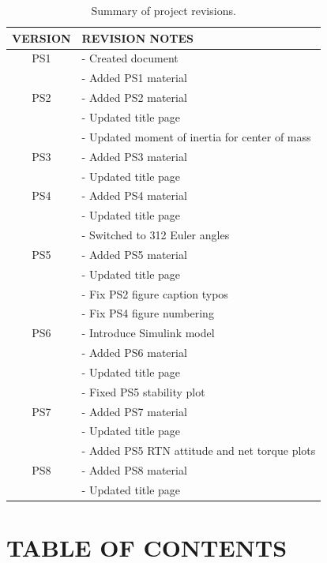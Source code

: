 \documentclass[12pt,a4paper,notitlepage]{article}
\begin{document}
\begin{table}[h!]
\begin{center}
\begin{tabular} [0.9 \textwidth]{cl}
\hline \hline
\multicolumn{1}{c}{VERSION} & \multicolumn{1}{l}{REVISION NOTES} \\
\hline
PS1 & - Created document \\
    & - Added PS1 material \\
\hline
PS2 & - Added PS2 material \\
    & - Updated title page \\
    & - Updated moment of inertia for center of mass \\
\hline
PS3 & - Added PS3 material \\
    & - Updated title page \\
\hline
PS4 & - Added PS4 material \\
    & - Updated title page \\
    & - Switched to 312 Euler angles \\
\hline
PS5 & - Added PS5 material \\
    & - Updated title page \\
    & - Fix PS2 figure caption typos \\
    & - Fix PS4 figure numbering \\
\hline
PS6 & - Introduce Simulink model \\
    & - Added PS6 material \\
    & - Updated title page \\
    & - Fixed PS5 stability plot \\
\hline
PS7 & - Added PS7 material \\
    & - Updated title page \\
    & - Added PS5 RTN attitude and net torque plots \\
\hline
PS8 & - Added PS8 material \\
    & - Updated title page \\
\hline \hline
\end{tabular}
	\caption{Summary of project revisions.}
\end{center}
\end{table}
 
\newpage
\section*{\Large TABLE OF CONTENTS}
\makeatletter
{}
\makeatother
\newpage
\end{document}
